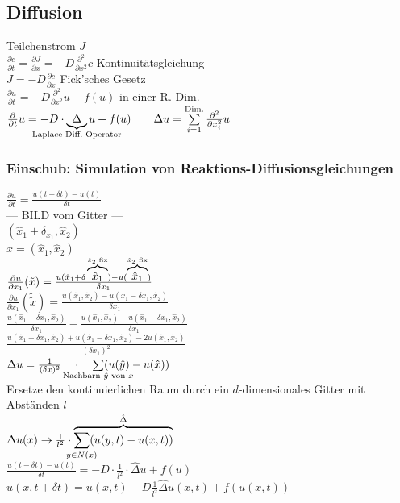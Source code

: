 \subsection{Diffusion}
Teilchenstrom $J$ \\
$ \frac{\partial c}{\partial t} = \frac{\partial J}{\partial x} = -D \frac{\partial^2}{\partial x^2} c $ \qquad Kontinuitätsgleichung \\
$ J = -D \frac{\partial c}{\partial x} $ \qquad Fick'sches Gesetz \\
$ \frac{\partial u}{\partial t} = - D \frac{\partial^2}{\partial x^2} u + f(u) $ \qquad in einer R.-Dim. \\
$ \frac{\partial}{\partial t} u = -D \cdot \underbrace{\Delta}_{\mathclap{\text{Laplace-Diff.-Operator}}} u 
+ f(u) \qquad \Delta u = \sum\limits_{i=1}^{\text{Dim.}} \frac{\partial^2}{\partial x_i^2} u $

\subsubsection{Einschub: Simulation von Reaktions-Diffusionsgleichungen}
$ \frac{\partial u}{\partial t} = \frac{u(t + \delta t) - u(t)}{\delta t} $ \\

--- BILD vom Gitter ---\\
$ (\hat{x}_1 + \delta_{x_1}, \hat{x}_2) $ \\
$ \hat{x} = (\hat{x}_1, \hat{x}_2) $ \\

$ \frac{\partial u}{\partial x_1}(\tilde{x}) = \frac{u(\hat{x}_1 + \delta \overbrace{\hat{x}_1}^{\mathclap{\hat{x}_2 \text{ fix}}}) - 
u(\overbrace{\hat{x}_1}^{\mathclap{\hat{x}_2 \text{ fix}}})}{\delta x_1} $ \\
$ \frac{\partial u}{\partial x_1}(\tilde{\tilde{x}}) = \frac{u(\hat{x}_1, \hat{x}_2) - u(\hat{x}_1 - \delta \hat{x}_1, \hat{x}_2)}{\delta x_1} $ \\

$ \frac{u(\hat{x}_1 + \delta x_1, \hat{x}_2)}{\delta x_1} - \frac{u(\hat{x}_1, \hat{x}_2) - u(\hat{x}_1 - \delta x_1, \hat{x}_2)}{\delta x_1} $ \\
$ \frac{u(\hat{x}_1 + \delta x_1, \hat{x}_2) + u(\hat{x}_1 - \delta x_1, \hat{x}_2) - 2u(\hat{x}_1, \hat{x}_2)}{(\delta x_1)^2} $ \\

$ \Delta u = \frac{1}{(\delta x)^2} \quad \cdot \quad \sum\limits_{\mathclap{\text{Nachbarn } \hat{y} \text{ von }x}}(u(\hat{y}) - u(\hat{x})) $ \\
Ersetze den kontinuierlichen Raum durch ein $d$-dimensionales Gitter mit Abständen $l$ \\
$ \Delta u(x) \rightarrow \frac{1}{l^2} \cdot \overbrace{\sum\limits_{\mathclap{y \in N(x)}}(u(y, t) - u(x, t))}^{\hat{\Delta}} $ \\
$ \frac{u(t - \delta t) - u(t)}{\delta t} = -D \cdot \frac{1}{l^2} \cdot \hat{\Delta} u + f(u) $ \\
$ u(x, t + \delta t) = u(x, t) -D \frac{1}{l^2} \hat{\Delta} u(x, t) + f(u(x, t)) $ \\
